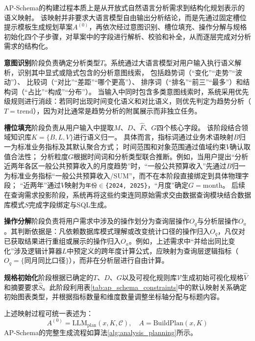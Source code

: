 AP-Schema的构建过程本质上是从开放式自然语言分析需求到结构化规划表示的语义映射。
该映射并非要求大语言模型自由输出分析结论，而是先通过固定槽位提示模板生成规划草案$A^{(0)}$，再依次经过意图识别、槽位填充、操作分解与规格初始化四个子步骤，对草案中的字段进行解析、校验和补全，从而逐层完成对分析需求的结构化。

\textbf{意图识别}阶段负责确定分析类型$T$。系统通过大语言模型对用户输入执行语义解析，识别其中显式或隐式包含的分析意图线索，
包括趋势词（“变化”“走势”“波动”）、
比较词（“对比”“差距”“哪个更高”）、
排序词（“排名”“前三”“最多”）和结构词（“占比”“构成”“分布”）。
当输入中同时包含多类意图线索时，系统采用优先级规则进行消歧：若同时出现时间变化语义和对比语义，则优先判定为趋势分析（$T=\text{trend}$），因为对比通常是趋势分析的附属展示而非独立任务。

\textbf{槽位填充}阶段负责从用户输入中提取$M$、$D$、$\hat{F}$、$G$四个核心字段。
该阶段结合领域知识库$K=\{B, L, V\}$进行语义归一。
具体而言，指标词通过业务术语映射$B$归一为标准业务指标及其默认聚合方式；
时间范围和对象范围通过值域约束$V$确认取值合法性；
分析粒度$G$根据时间词和分析类型联合推断。例如，当用户提出“分析近两年各区一般公共预算收入的月度趋势”时，“一般公共预算收入”先通过$B$归一为标准业务指标“一般公共预算收入/SUM”，而不在本阶段直接绑定到具体物理字段；
“近两年”通过$V$映射为\texttt{年份$\in$\{2024, 2025\}}，“月度”确定$G=\text{month}$。
后续在查询需求投影阶段，系统再将这些约束连同原始需求交由数据查询模块结合数据库模式$S$完成字段绑定与SQL生成。

\textbf{操作分解}阶段负责将用户需求中涉及的操作划分为查询层操作$O_q$与分析层操作$O_a$。其判断依据是：凡依赖数据库模式理解或改变统计口径的操作归入$O_q$，凡仅对已获取结果进行重组或展示的操作归入$O_a$。例如，上述需求中“并给出同比变化”涉及逻辑计算器$L$中预定义的跨年度计算公式，应映射为查询层逻辑指标（$O_q = \{\text{同月同比口径}\}$），而非在分析层进行自由计算。

\textbf{规格初始化}阶段根据已确定的$T$、$D$、$G$以及可视化规则库$\mathcal{V}$生成初始可视化规格$\hat{V}$和摘要要求$\hat{S}$。此阶段利用表\ref{tab:ap_schema_constraints}中的默认映射关系确定初始图表类型，并根据指标数量和维度数量调整坐标轴分配与标题内容。

上述映射过程可统一表述为：
\begin{equation}
        A^{(0)} = \text{LLM}_{\text{plan}}(x, K, \mathcal{C}), \quad A = \text{BuildPlan}(x, K)
\label{eq:build_plan}
\end{equation}
AP-Schema的完整生成流程如算法\ref{alg:analysis_planning}所示。

